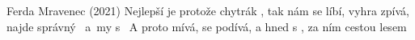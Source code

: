 \begin{TEXT}{Ferda Mravenec (2021)}
\SLOKA*
Nejlepší je  protože  chytrák 
 , tak nám se líbí, vyhra
 zpívá,  najde správný~
a~my s~
\SLOKA*
A proto  mívá,  se podívá,
a hned s , za ním  
cestou  lesem 
\end{TEXT}